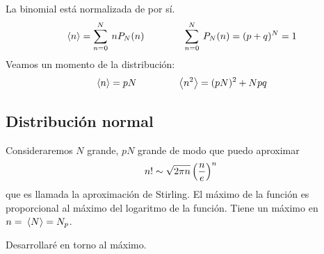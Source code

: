 \documentclass[10pt,oneside]{CBFT_book}
\begin{document}
La binomial está normalizada de por sí.
\[
	\:\left\langle n \right\rangle = \sum_{n=0}^N \: n P_N(n) \qquad \qquad 
	\sum_{n=0}^N \: P_N(n) = ( p + q )^N = 1
\]
Veamos un momento de la distribución:
\[
	\:\left\langle n \right\rangle = p N \qquad \qquad  \:\left\langle n^2 \right\rangle = (p N)^2 + N p q
\]

\subsection{Distribución normal}

Consideraremos $N$ grande, $pN$ grande de modo que puedo aproximar 
\[
	n! \sim \sqrt{2\pi n} \left( \frac{ n }{ e } \right)^n
\]
que es llamada la aproximación de Stirling.
El máximo de la función es proporcional al máximo del logaritmo de la función.
Tiene un máximo en $n = \:\left\langle N \right\rangle = N_p$.

Desarrollaré en torno al máximo.

\end{document}
